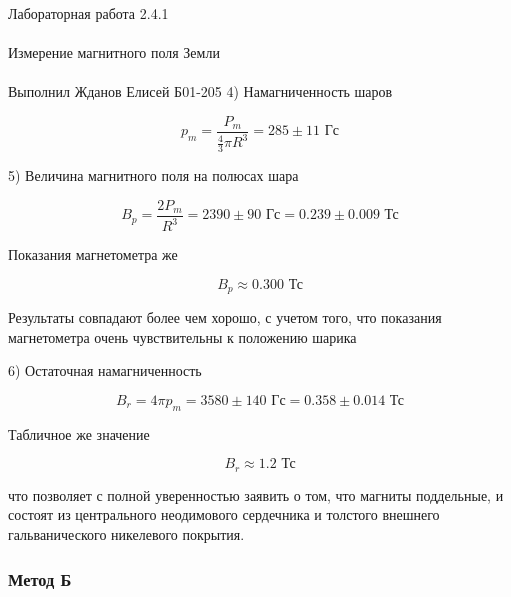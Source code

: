 \documentclass{astroedu-lab}
\begin{document}
\begin{problem}{\huge Лабораторная работа 2.4.1\\\\Измерение магнитного поля Земли\\\\Выполнил Жданов Елисей Б01-205}
4) Намагниченность шаров

\begin{equation}
	p_m = \frac{P_m}{\frac{4}{3} \pi R^3} = 285 \pm 11 \text{ Гс}
\end{equation}

5) Величина магнитного поля на полюсах шара

\begin{equation}
	B_p = \frac{2 P_m}{R^3} = 2390 \pm 90 \text{ Гс} = 0.239 \pm 0.009 \text{ Тс}
\end{equation}

Показания магнетометра же

\begin{equation}
	B_p \approx 0.300 \text{ Тс}
\end{equation}

Результаты совпадают более чем хорошо, с учетом того, что показания магнетометра очень чувствительны к положению шарика

6) Остаточная намагниченность

\begin{equation}
	B_r = 4 \pi p_m = 3580 \pm 140 \text{ Гс} = 0.358 \pm 0.014 \text{ Тс}
\end{equation}

Табличное же значение

\begin{equation}
	B_r \approx 1.2 \text{ Тс}
\end{equation}

что позволяет с полной уверенностью заявить о том, что магниты поддельные, и состоят из центрального неодимового сердечника и толстого внешнего гальванического никелевого покрытия.

\subsubsection{Метод Б}


\end{problem}
\end{document}
